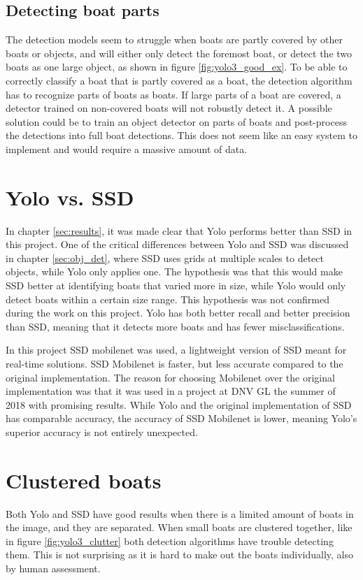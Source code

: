 \subsection{Detecting boat parts}
\label{sec:boat_parts}
The detection models seem to struggle when boats are partly covered by other boats or objects, and will either only detect the foremost boat, or detect the two boats as one large object, as shown in figure \ref{fig:yolo3_good_ex}. To be able to correctly classify a boat that is partly covered as a boat, the detection algorithm has to recognize parts of boats as boats. If large parts of a boat are covered, a detector trained on non-covered boats will not robustly detect it. A possible solution could be to train an object detector on parts of boats and post-process the detections into full boat detections. This does not seem like an easy system to implement and would require a massive amount of data. 



\section{Yolo vs. SSD}
In chapter \ref{sec:results}, it was made clear that Yolo performs better than SSD in this project. One of the critical differences between Yolo and SSD was discussed in chapter \ref{sec:obj_det}, where SSD uses grids at multiple scales to detect objects, while Yolo only applies one. The hypothesis was that this would make SSD better at identifying boats that varied more in size, while Yolo would only detect boats within a certain size range. This hypothesis was not confirmed during the work on this project. Yolo has both better recall and better precision than SSD, meaning that it detects more boats and has fewer misclassifications. 

\vspace{3mm}

In this project SSD mobilenet was used, a lightweight version of SSD meant for real-time solutions. SSD Mobilenet is faster, but less accurate compared to the original implementation. The reason for choosing Mobilenet over the original implementation was that it was used in a project at DNV GL the summer of 2018 with promising results. While Yolo and the original implementation of SSD has comparable accuracy, the accuracy of SSD Mobilenet is lower, meaning Yolo's superior accuracy is not entirely unexpected. 

\section{Clustered boats}
Both Yolo and SSD have good results when there is a limited amount of boats in the image, and they are separated. When small boats are clustered together, like in figure \ref{fig:yolo3_clutter} both detection algorithms have trouble detecting them. This is not surprising as it is hard to make out the boats individually, also by human assessment. 

